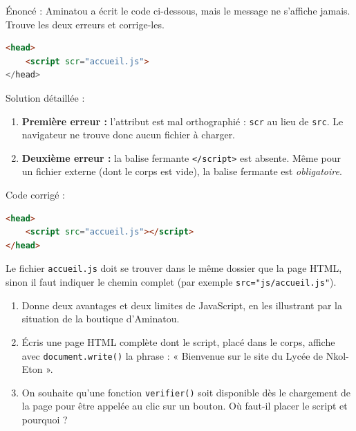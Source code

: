 \documentclass[11pt]{article}
\begin{document}
\begin{exoresolu}
Énoncé : Aminatou a écrit le code ci-dessous, mais le message ne s'affiche jamais. Trouve les deux erreurs et corrige-les.
\begin{lstlisting}[language=HTML]
<head>
    <script scr="accueil.js">
</head>
\end{lstlisting}
\tcblower
Solution détaillée :
\begin{enumerate}
\item \textbf{Première erreur :} l'attribut est mal orthographié : \texttt{scr} au lieu de \texttt{src}. Le navigateur ne trouve donc aucun fichier à charger.
\item \textbf{Deuxième erreur :} la balise fermante \texttt{</script>} est absente. Même pour un fichier externe (dont le corps est vide), la balise fermante est \emph{obligatoire}.
\end{enumerate}
Code corrigé :
\begin{lstlisting}[language=HTML]
<head>
    <script src="accueil.js"></script>
</head>
\end{lstlisting}
Le fichier \texttt{accueil.js} doit se trouver dans le même dossier que la page HTML, sinon il faut indiquer le chemin complet (par exemple \texttt{src="js/accueil.js"}).
\end{exoresolu}

\begin{exercice}
\begin{enumerate}
\item Donne deux avantages et deux limites de JavaScript, en les illustrant par la situation de la boutique d'Aminatou.
\item Écris une page HTML complète dont le script, placé dans le corps, affiche avec \texttt{document.write()} la phrase : « Bienvenue sur le site du Lycée de Nkol-Eton ».
\item On souhaite qu'une fonction \texttt{verifier()} soit disponible dès le chargement de la page pour être appelée au clic sur un bouton. Où faut-il placer le script et pourquoi ?
\end{enumerate}
\end{exercice}
\end{document}
